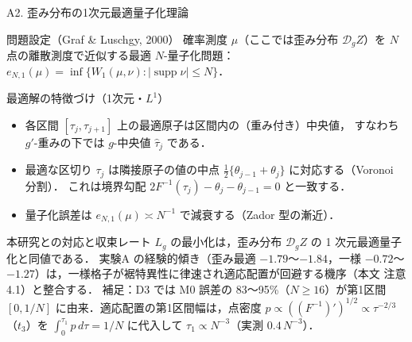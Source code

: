 \documentclass[aspectratio=169, 10pt]{beamer}
\providecommand{\Finv}{}\renewcommand{\Finv}{F^{-1}}
\newcommand{\Lg}{L_g}
\newcommand{\dist}{\mathcal{D}_g}
\begin{document}
\begin{frame}{A2. 歪み分布の1次元最適量子化理論}
  \small
  \begin{block}{問題設定（Graf \& Luschgy, 2000）}
    確率測度 $\mu$（ここでは歪み分布 $\dist Z$）を $N$ 点の離散測度で近似する最適 $N$-量子化問題：
    $e_{N,1}(\mu)=\inf\{W_1(\mu,\nu) : |\operatorname{supp}\nu|\le N\}$．
  \end{block}
  \begin{block}{最適解の特徴づけ（1次元・$L^1$）}
    \begin{itemize}
      \item 各区間 $[\tau_j,\tau_{j+1}]$ 上の最適原子は区間内の\alert{（重み付き）中央値}，
            すなわち $g'$-重みの下では $g$-中央値 $\hat\tau_j$ である．
      \item 最適な区切り $\tau_j$ は隣接原子の値の中点 $\tfrac12\{\theta_{j-1}+\theta_j\}$ に対応する（Voronoi 分割）．
            これは境界勾配 $2\Finv(\tau_j)-\theta_j-\theta_{j-1}=0$ と一致する．
      \item 量子化誤差は $e_{N,1}(\mu)\asymp N^{-1}$ で減衰する（Zador 型の漸近）．
    \end{itemize}
  \end{block}
  \begin{exampleblock}{本研究との対応と収束レート}
    \footnotesize
    $\Lg$ の最小化は，歪み分布 $\dist Z$ の 1 次元最適量子化と同値である．
    実験A の経験的傾き（歪み最適 $-1.79$〜$-1.84$，一様 $-0.72$〜$-1.27$）は，一様格子が裾特異性に律速され適応配置が回避する機序（本文 注意4.1）と整合する．
    補足：D3 では M0 誤差の 83〜95\%（$N\ge16$）が第1区間 $[0,1/N]$ に由来．適応配置の第1区間幅は，点密度 $p\propto((\Finv)')^{1/2}\propto\tau^{-2/3}$（$t_3$）を $\int_0^{\tau_1}p\,d\tau=1/N$ に代入して $\tau_1\propto N^{-3}$（実測 $0.4\,N^{-3}$）．
  \end{exampleblock}
\end{frame}
\end{document}

